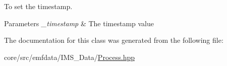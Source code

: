 To set the timestamp. 


\begin{DoxyParams}{Parameters}
{\em \_\-timestamp} & The timestamp value \\
\hline
\end{DoxyParams}


The documentation for this class was generated from the following file:\begin{DoxyCompactItemize}
\item 
core/src/emfdata/IMS\_\-Data/\hyperlink{Process_8hpp}{Process.hpp}\end{DoxyCompactItemize}
